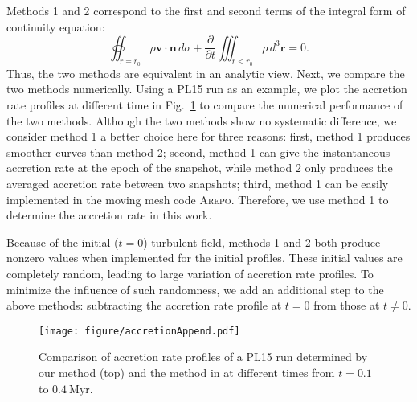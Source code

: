 \documentclass[fleqn,usenatbib]{mnras}
\begin{document}
Methods 1 and 2 correspond to the first and second terms of the integral form of continuity equation:
\begin{equation}
    \oiint_{r=r_0}\rho\mathbf{v}\cdot\mathbf{n}\,d\sigma + \frac{\partial}{\partial t}\iiint_{r<r_0}\rho\,d^3\mathbf{r}=0.
    \label{eq:continuity}
\end{equation}
Thus, the two methods are equivalent in an analytic view. Next, we compare the two methods numerically. Using a PL15 run as an example, we plot the accretion rate profiles at different time in Fig.~\ref{fig:accretionAppend} to compare the numerical performance of the two methods. Although the two methods show no systematic difference, we consider method 1 a better choice here for three reasons: first, method 1 produces smoother curves than method 2; second, method 1 can give the instantaneous accretion rate at the epoch of the snapshot, while method 2 only produces the averaged accretion rate between two snapshots; third, method 1 can be easily implemented in the moving mesh code \textsc{Arepo}. Therefore, we use method 1 to determine the accretion rate in this work.

Because of the initial ($t=0$) turbulent field, methods 1 and 2 both produce nonzero values when implemented for the initial profiles. These initial values are completely random, leading to large variation of accretion rate profiles. To minimize the influence of such randomness, we add an additional step to the above methods: subtracting the accretion rate profile at $t=0$ from those at $t\neq 0$.


\begin{figure}
\texttt{[image: figure/accretionAppend.pdf]}
\caption{Comparison of accretion rate profiles of a PL15 run determined by our method (top) and the method in \citet[][bottom]{howard_universal_2018} at different times from $t=0.1$ to $0.4\ \mathrm{Myr}$.}
  \label{fig:accretionAppend}
\end{figure}




\bsp	%
\label{lastpage}
\end{document}
